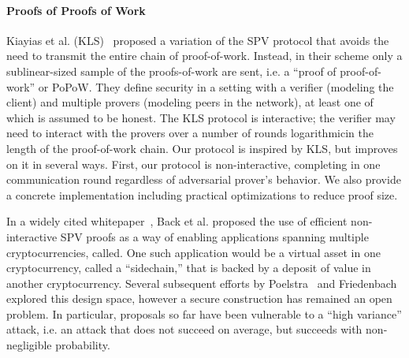 \paragraph{Proofs of Proofs of Work}
Kiayias et al. (KLS)~\cite{KLS} proposed a variation of the SPV protocol that avoids the need to transmit the entire chain of proof-of-work. Instead, in their scheme only a sublinear-sized sample of the proofs-of-work are sent, i.e. a ``proof of proof-of-work'' or PoPoW. They define security in a setting with a verifier (modeling the client) and multiple provers (modeling peers in the network), at least one of which is assumed to be honest. The KLS protocol is interactive; the verifier may need to interact with the provers over a number of rounds logarithmicin the length of the proof-of-work chain.
Our protocol is inspired by KLS, but improves on it in several ways. First, our protocol is non-interactive, completing in one communication round regardless of adversarial prover's behavior. We also provide a concrete implementation including practical optimizations to reduce proof size.

In a widely cited whitepaper~\cite{sidechains}, Back et al. proposed the use of efficient non-interactive SPV proofs as a way of enabling applications spanning multiple cryptocurrencies, called. One such application would be a virtual asset in one cryptocurrency, called a ``sidechain,'' that is backed by a deposit of value in another cryptocurrency. Several subsequent efforts by Poelstra~\cite{pos} and Friedenbach~\cite{compactspv} explored this design space, however a secure construction has remained an open problem. In particular, proposals so far have been vulnerable to a ``high variance'' attack, i.e. an attack that does not succeed on average, but succeeds with non-negligible probability. 

